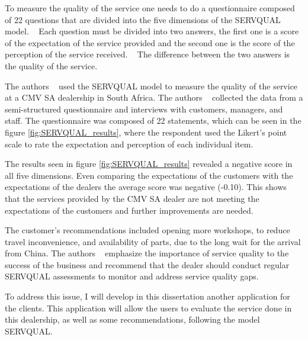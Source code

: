 To measure the quality of the service one needs to do a questionnaire composed of 22 questions that are divided into the five dimensions of the SERVQUAL model. ~\cite{Measuring_After_sales_Service_Quality}
Each question must be divided into two answers, the first one is a score of the expectation of the service provided and the second one is the score of the perception of the service received. ~\cite{Measuring_After_sales_Service_Quality}
The difference between the two answers is the quality of the service. ~\cite{servqual_blog_da_qualidade} ~\cite{Measuring_After_sales_Service_Quality} ~\cite{SERVQUAL_OLD}

The authors ~\citet{Measuring_After_sales_Service_Quality} used the SERVQUAL model to measure the quality of the service at a CMV SA dealership in South Africa.
The authors ~\citet{Measuring_After_sales_Service_Quality} collected the data from a semi-structured questionnaire and interviews with customers, managers, and staff.
The questionnaire was composed of 22 statements, which can be seen in the figure \ref{fig:SERVQUAL_results}, where the respondent used the Likert's point scale to rate the expectation and perception of each individual item.

The results seen in figure \ref{fig:SERVQUAL_results} revealed a negative score in all five dimensions. 
Even comparing the expectations of the customers with the expectations of the dealers the average score was negative (-0.10).
This shows that the services provided by the CMV SA dealer are not meeting the expectations of the customers and further improvements are needed. ~\cite{Measuring_After_sales_Service_Quality}

The customer's recommendations included opening more workshops, to reduce travel inconvenience, and availability of parts, due to the long wait for the arrival from China.
The authors ~\citet{Measuring_After_sales_Service_Quality} emphasize the importance of service quality to the success of the business and recommend that the dealer should conduct regular SERVQUAL assessments to monitor and address service quality gaps. ~\cite{Measuring_After_sales_Service_Quality}

To address this issue, I will develop in this dissertation another application for the clients. 
This application will allow the users to evaluate the service done in this dealership, as well as some recommendations, following the model SERVQUAL. 

